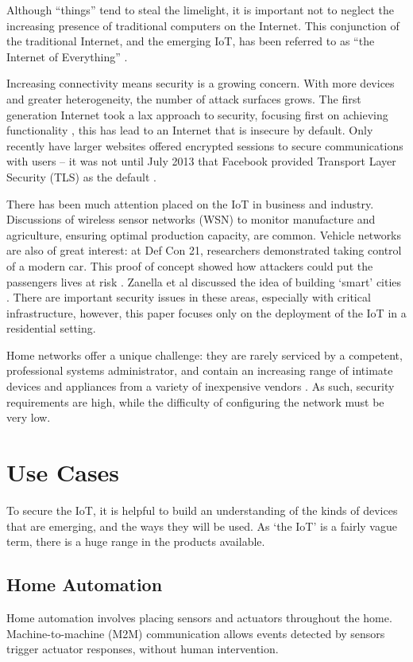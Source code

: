 \documentclass[10pt,journal,compsoc]{IEEEtran}
\begin{document}
Although ``things'' tend to steal the limelight, it is important not to neglect
the increasing presence of traditional computers on the Internet. This
conjunction of the traditional Internet, and the emerging IoT, has been
referred to as ``the Internet of Everything'' \cite{CiscoEverything}. 

Increasing connectivity means security is a growing concern. With more devices
and greater heterogeneity, the number of attack surfaces grows. The first
generation Internet took a lax approach to security, focusing first on
achieving functionality \cite{Bhimani1996}, this has lead to an Internet that
is insecure by default. Only recently have larger websites offered encrypted
sessions to secure communications with users -- it was not until July 2013 that
Facebook provided Transport Layer Security (TLS) as the default
\cite{Facebook2013}. 

There has been much attention placed on the IoT in business and industry.
Discussions of wireless sensor networks (WSN) to monitor manufacture and
agriculture, ensuring optimal production capacity, are common. Vehicle networks
are also of great interest: at Def Con 21, researchers demonstrated taking
control of a modern car. This proof of concept showed how attackers could put
the passengers lives at risk \cite{Illera2014}. Zanella et al discussed the
idea of building `smart' cities \cite{Zanella2014}. There are important
security issues in these areas, especially with critical infrastructure,
however, this paper focuses only on the deployment of the IoT in a residential
setting. 

Home networks offer a unique challenge: they are rarely serviced by a
competent, professional systems administrator, and contain an increasing range
of intimate devices and appliances from a variety of inexpensive vendors
\cite{ACM_ModHome}. As such, security requirements are high, while the
difficulty of configuring the network must be very low. 

\section{Use Cases}
To secure the IoT, it is helpful to build an understanding of the kinds of
devices that are emerging, and the ways they will be used. As `the IoT' is a
fairly vague term, there is a huge range in the products available.

\subsection{Home Automation}
Home automation involves placing sensors and actuators throughout the home.
Machine-to-machine (M2M) communication allows events detected by sensors
trigger actuator responses, without human intervention. 
\end{document}

